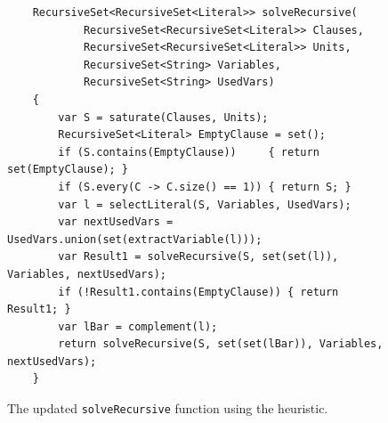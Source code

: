 \begin{figure}[!ht]
  \centering
\begin{verbatim}
    RecursiveSet<RecursiveSet<Literal>> solveRecursive(
            RecursiveSet<RecursiveSet<Literal>> Clauses,
            RecursiveSet<RecursiveSet<Literal>> Units,
            RecursiveSet<String> Variables,
            RecursiveSet<String> UsedVars)
    {
        var S = saturate(Clauses, Units);
        RecursiveSet<Literal> EmptyClause = set();
        if (S.contains(EmptyClause))     { return set(EmptyClause); }
        if (S.every(C -> C.size() == 1)) { return S; }
        var l = selectLiteral(S, Variables, UsedVars);
        var nextUsedVars = UsedVars.union(set(extractVariable(l)));
        var Result1 = solveRecursive(S, set(set(l)), Variables, nextUsedVars);
        if (!Result1.contains(EmptyClause)) { return Result1; }
        var lBar = complement(l);
        return solveRecursive(S, set(set(lBar)), Variables, nextUsedVars);
    }
\end{verbatim}
\vspace*{-0.3cm}
  \caption{The updated \texttt{solveRecursive} function using the heuristic.}
  \label{fig:solve_recursive_jw}
\end{figure}

